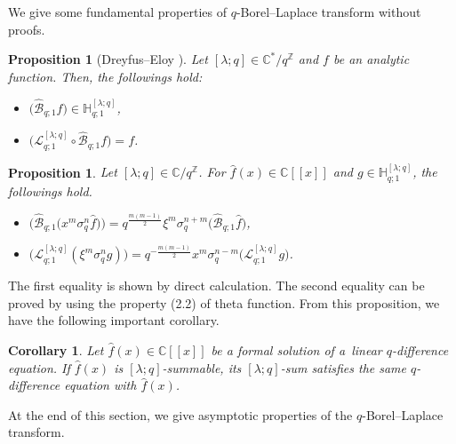\documentclass[11pt]{article}
\numberwithin{equation}{section}
\newtheorem{Corollary}[Theorem]{Corollary}
\newtheorem{Proposition}[Theorem]{Proposition}
\begin{document}
We give some fundamental properties of $q$-Borel--Laplace transform without proofs.
\begin{Proposition}[Dreyfus--Eloy {\cite[Section~1]{DreyfusEloy2016}}] Let $[\lambda;q]\in\mathbb{C}^*/q^\mathbb{Z}$ and $f$ be an analytic function. Then, the followings hold:
\begin{itemize}\itemsep=0pt
\item $\big(\hat{\mathcal{B}}_{q;1}f\big)\in\mathbb{H}_{q;1}^{[\lambda;q]}$,
\item $\big(\mathcal{L}_{q;1}^{[\lambda;q]}\circ\hat{\mathcal{B}}_{q;1}f\big)=f$.
\end{itemize}
\end{Proposition}
\begin{Proposition}\label{prop_borel2} Let $[\lambda;q]\in\mathbb{C}/q^\mathbb{Z}$. For $\hat{f}(x)\in\mathbb{C}[[x]]$ and $g\in\mathbb{H}_{q;1}^{[\lambda;q]}$, the followings hold.
\begin{itemize}\itemsep=0pt
\item $\big(\hat{\mathcal{B}}_{q;1}\big(x^m\sigma_q^n\hat{f}\big)\big)=q^{\frac{m(m-1)}{2}}\xi^m\sigma_q^{n+m}\big(\hat{\mathcal{B}}_{q;1}\hat{f}\big)$,
\item $\big(\mathcal{L}_{q;1}^{[\lambda;q]}(\xi^m\sigma_q^ng)\big)=q^{-\frac{m(m-1)}{2}}x^m\sigma_q^{n-m}\big(\mathcal{L}_{q;1}^{[\lambda;q]}g\big)$.
\end{itemize}
\end{Proposition}
The first equality is shown by direct calculation. The second equality can be proved by using the property (2.2) of theta function. From this proposition, we have the following important corollary.
\begin{Corollary}\label{cor_q-diff}
Let $\hat{f}(x)\in\mathbb{C}[[x]]$ be a formal solution of a~linear $q$-difference equation. If $\hat{f}(x)$ is $[\lambda;q]$-summable, its $[\lambda;q]$-sum satisfies the same $q$-difference equation with $\hat{f}(x)$.
\end{Corollary}

At the end of this section, we give asymptotic properties of the $q$-Borel--Laplace transform.
\end{document}
